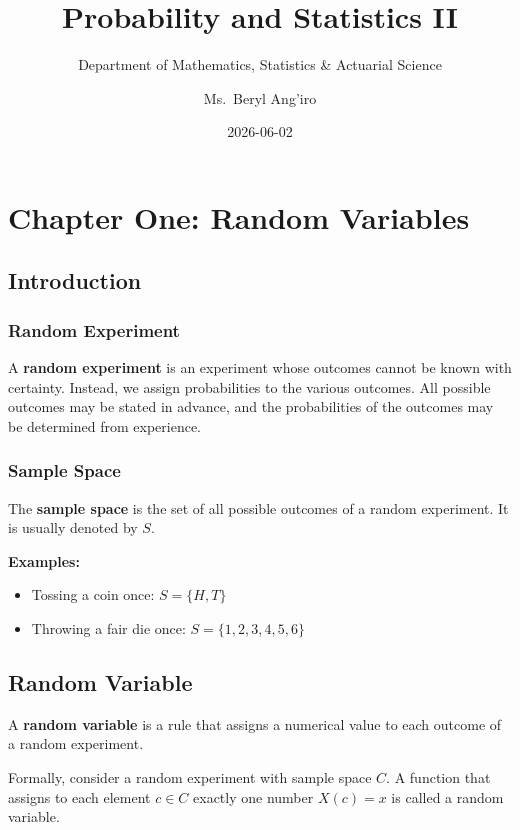 \documentclass[
]{article}
\title{Probability and Statistics II}
\subtitle{Department of Mathematics, Statistics \& Actuarial Science}
\author{Ms.~Beryl Ang'iro}
\date{2026-06-02}
\providecommand{\tightlist}{%
  \setlength{\itemsep}{0pt}\setlength{\parskip}{0pt}}
\begin{document}
\maketitle

{
\setcounter{tocdepth}{3}
\tableofcontents
}
\section{Chapter One: Random
Variables}\label{chapter-one-random-variables}

\subsection{Introduction}\label{introduction}

\subsubsection{Random Experiment}\label{random-experiment}

A \textbf{random experiment} is an experiment whose outcomes cannot be
known with certainty. Instead, we assign probabilities to the various
outcomes. All possible outcomes may be stated in advance, and the
probabilities of the outcomes may be determined from experience.

\subsubsection{Sample Space}\label{sample-space}

The \textbf{sample space} is the set of all possible outcomes of a
random experiment. It is usually denoted by \(S\).

\textbf{Examples:}

\begin{itemize}
\tightlist
\item
  Tossing a coin once: \(S = \{H, T\}\)
\item
  Throwing a fair die once: \(S = \{1, 2, 3, 4, 5, 6\}\)
\end{itemize}

\subsection{Random Variable}\label{random-variable}

A \textbf{random variable} is a rule that assigns a numerical value to
each outcome of a random experiment.

Formally, consider a random experiment with sample space \(C\). A
function that assigns to each element \(c \in C\) exactly one number
\(X(c) = x\) is called a random variable.
\end{document}
